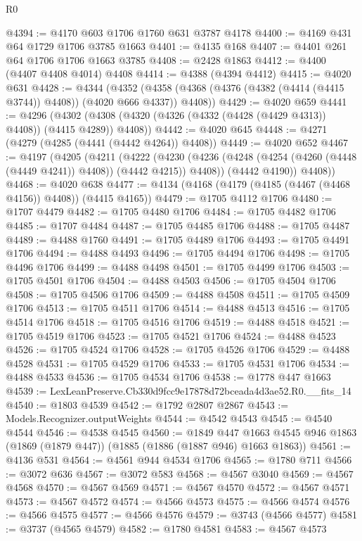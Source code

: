 \begin{lexlean}{R0}
\begin{coremodule}
@4394 := @4170 @603 @1706 @1760 @631 @3787 @4178
@4400 := @4169 @431 @64 @1729 @1706 @3785 @1663
@4401 := @4135 @168
@4407 := @4401 @261 @64 @1706 @1706 @1663 @3785
@4408 := @2428 @1863
@4412 := @4400 (@4407 @4408 @4014) @4408
@4414 := @4388 (@4394 @4412)
@4415 := @4020 @631
@4428 := @4344
    (@4352 (@4358 (@4368 (@4376 (@4382 (@4414 (@4415 @3744)) @4408)) (@4020 @666 @4337)) @4408))
@4429 := @4020 @659
@4441 := @4296
    (@4302 (@4308 (@4320 (@4326 (@4332 (@4428 (@4429 @4313)) @4408)) (@4415 @4289)) @4408))
@4442 := @4020 @645
@4448 := @4271 (@4279 (@4285 (@4441 (@4442 @4264)) @4408))
@4449 := @4020 @652
@4467 := @4197
    (@4205
      (@4211
        (@4222
          (@4230 (@4236 (@4248 (@4254 (@4260 (@4448 (@4449 @4241)) @4408)) (@4442 @4215)) @4408))
          (@4442 @4190))
        @4408))
@4468 := @4020 @638
@4477 := @4134 (@4168 (@4179 (@4185 (@4467 (@4468 @4156)) @4408)) (@4415 @4165))
@4479 := @1705 @4112 @1706
@4480 := @1707 @4479
@4482 := @1705 @4480 @1706
@4484 := @1705 @4482 @1706
@4485 := @1707 @4484
@4487 := @1705 @4485 @1706
@4488 := @1705 @4487
@4489 := @4488 @1760
@4491 := @1705 @4489 @1706
@4493 := @1705 @4491 @1706
@4494 := @4488 @4493
@4496 := @1705 @4494 @1706
@4498 := @1705 @4496 @1706
@4499 := @4488 @4498
@4501 := @1705 @4499 @1706
@4503 := @1705 @4501 @1706
@4504 := @4488 @4503
@4506 := @1705 @4504 @1706
@4508 := @1705 @4506 @1706
@4509 := @4488 @4508
@4511 := @1705 @4509 @1706
@4513 := @1705 @4511 @1706
@4514 := @4488 @4513
@4516 := @1705 @4514 @1706
@4518 := @1705 @4516 @1706
@4519 := @4488 @4518
@4521 := @1705 @4519 @1706
@4523 := @1705 @4521 @1706
@4524 := @4488 @4523
@4526 := @1705 @4524 @1706
@4528 := @1705 @4526 @1706
@4529 := @4488 @4528
@4531 := @1705 @4529 @1706
@4533 := @1705 @4531 @1706
@4534 := @4488 @4533
@4536 := @1705 @4534 @1706
@4538 := @1778 @447 @1663
@4539 := LexLeanPreserve.Cb330d9fcc9e17878d72bceada4d3ae52.R0.__fits_14
@4540 := @1803 @4539
@4542 := @1792 @2807 @2867
@4543 := Models.Recognizer.outputWeights
@4544 := @4542 @4543
@4545 := @4540 @4544
@4546 := @4538 @4545
@4560 := @1849
    @447
    @1663
    @4545
    @946
    @1863
    (@1869 (@1879 @447))
    (@1885 (@1886 (@1887 @946) @1663 @1863))
@4561 := @4136 @531
@4564 := @4561 @944 @4534 @1706
@4565 := @1780 @711
@4566 := @3072 @636
@4567 := @3072 @583
@4568 := @4567 @3040
@4569 := @4567 @4568
@4570 := @4567 @4569
@4571 := @4567 @4570
@4572 := @4567 @4571
@4573 := @4567 @4572
@4574 := @4566 @4573
@4575 := @4566 @4574
@4576 := @4566 @4575
@4577 := @4566 @4576
@4579 := @3743 (@4566 @4577)
@4581 := @3737 (@4565 @4579)
@4582 := @1780 @4581
@4583 := @4567 @4573

\end{coremodule}
\end{lexlean}
